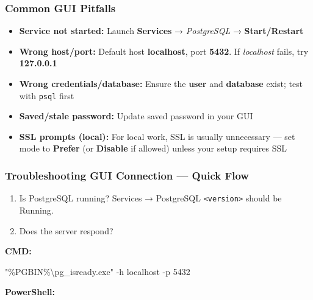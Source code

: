 \documentclass[
  letterpaper,
  DIV=11,
  numbers=noendperiod]{scrartcl}
\newenvironment{Shaded}{\begin{snugshade}}{\end{snugshade}}
\newcommand{\AttributeTok}[1]{\textcolor[rgb]{0.40,0.45,0.13}{#1}}
\newcommand{\DecValTok}[1]{\textcolor[rgb]{0.68,0.00,0.00}{#1}}
\newcommand{\NormalTok}[1]{\textcolor[rgb]{0.00,0.23,0.31}{#1}}
\newcommand{\OperatorTok}[1]{\textcolor[rgb]{0.37,0.37,0.37}{#1}}
\newcommand{\PreprocessorTok}[1]{\textcolor[rgb]{0.68,0.00,0.00}{#1}}
\newcommand{\StringTok}[1]{\textcolor[rgb]{0.13,0.47,0.30}{#1}}
\newcommand{\VariableTok}[1]{\textcolor[rgb]{0.07,0.07,0.07}{#1}}
\providecommand{\tightlist}{%
  \setlength{\itemsep}{0pt}\setlength{\parskip}{0pt}}\usepackage{longtable,booktabs,array}
\begin{document}
\subsubsection{Common GUI Pitfalls}\label{common-gui-pitfalls}

\begin{itemize}
\tightlist
\item
  \textbf{Service not started:} Launch \textbf{Services} →
  \emph{PostgreSQL } → \textbf{Start/Restart}
\item
  \textbf{Wrong host/port:} Default host \textbf{localhost}, port
  \textbf{5432}. If \emph{localhost} fails, try \textbf{127.0.0.1}
\item
  \textbf{Wrong credentials/database:} Ensure the \textbf{user} and
  \textbf{database} exist; test with \texttt{psql} first
\item
  \textbf{Saved/stale password:} Update saved password in your GUI
\item
  \textbf{SSL prompts (local):} For local work, SSL is usually
  unnecessary --- set mode to \textbf{Prefer} (or \textbf{Disable} if
  allowed) unless your setup requires SSL
\end{itemize}

\subsubsection{Troubleshooting GUI Connection --- Quick
Flow}\label{troubleshooting-gui-connection-quick-flow}

\begin{enumerate}
\def\labelenumi{\arabic{enumi}.}
\item
  Is PostgreSQL running? Services → PostgreSQL
  \texttt{\textless{}version\textgreater{}} should be Running.
\item
  Does the server respond?
\end{enumerate}

\textbf{CMD:}

\begin{Shaded}
\begin{Highlighting}[]
\StringTok{"}\PreprocessorTok{\%}\VariableTok{PGBIN}\PreprocessorTok{\%}\StringTok{\textbackslash{}pg\_isready.exe"}\NormalTok{ {-}h localhost }\AttributeTok{{-}p}\NormalTok{ 5432}
\end{Highlighting}
\end{Shaded}

\textbf{PowerShell:}

\begin{Shaded}
\end{Shaded}
\end{document}
